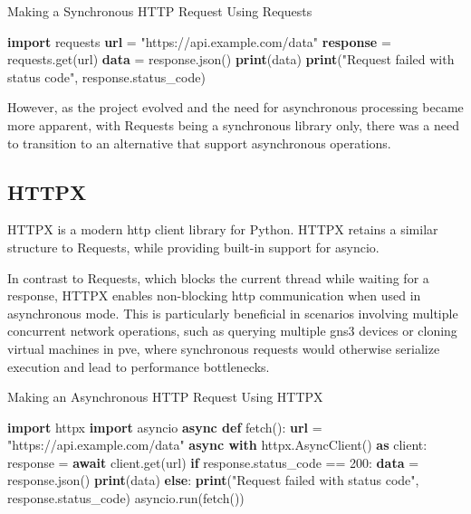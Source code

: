\begin{algorithm}
  \caption{Making a Synchronous HTTP Request Using Requests}\label{requests-basic}
  \begin{algorithmic}[1]
    \State \textbf{import} requests
    \State
    \State \textbf{url} = "https://api.example.com/data"
    \State \textbf{response} = requests.get(url)
    \State
      \State \textbf{data} = response.json()
      \State \textbf{print}(data)
    \Else
      \State \textbf{print}("Request failed with status code", response.status\_code)
    \EndIf
  \end{algorithmic}
\end{algorithm}

However, as the project evolved and the need for asynchronous processing became more apparent, with Requests being a 
synchronous library only, there was a need to transition to an alternative that support asynchronous operations.

\subsection{HTTPX}

HTTPX\cite{httpx2025} is a modern \ac{http} client library for Python. HTTPX retains a similar structure to 
Requests, while providing  built-in support for asyncio.

In contrast to Requests, which blocks the current thread while waiting for a response, HTTPX enables non-blocking 
\ac{http} communication when used in asynchronous mode. This is particularly beneficial in scenarios involving multiple 
concurrent network operations, such as querying multiple \ac{gns3} devices or cloning virtual machines in \ac{pve}, 
where synchronous requests would otherwise serialize execution and lead to performance bottlenecks.

\begin{algorithm}
  \caption{Making an Asynchronous HTTP Request Using HTTPX}\label{httpx-basic}
  \begin{algorithmic}[1]
    \State \textbf{import} httpx
    \State \textbf{import} asyncio
    \State
    \State \textbf{async def} fetch():
    \State \hspace{1em} \textbf{url} = "https://api.example.com/data"
    \State \hspace{1em} \textbf{async with} httpx.AsyncClient() \textbf{as} client:
    \State \hspace{2em} response = \textbf{await} client.get(url)
    \State \hspace{2em} \textbf{if} response.status\_code == 200:
    \State \hspace{3em} \textbf{data} = response.json()
    \State \hspace{3em} \textbf{print}(data)
    \State \hspace{2em} \textbf{else}:
    \State \hspace{3em} \textbf{print}("Request failed with status code", response.status\_code)
    \State
    \State asyncio.run(fetch())
  \end{algorithmic}
\end{algorithm}

